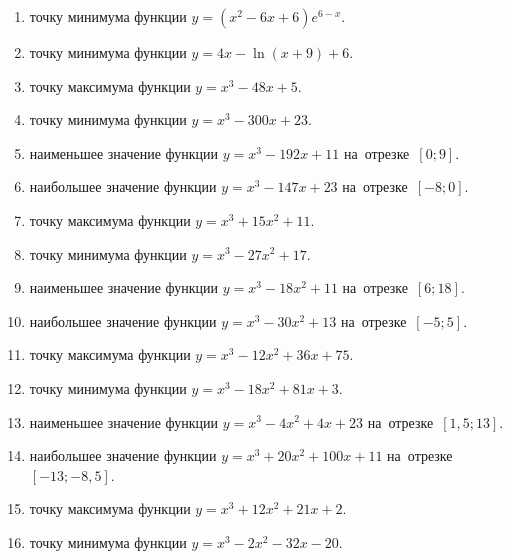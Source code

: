 \documentclass[a4paper,10pt]{article}
\begin{document}
\begin{enumerate}
\item {} точку минимума функции $y=\left(x^2-6x+6\right){{e}^{6-x}}$.

\item {} точку минимума функции $y=4x-\ln \left(x+9\right)+6$.

\item {} точку максимума функции $y=x^3 -48x +5$.

\item {} точку минимума функции $y=x^3 -300x+23$.

\item {} наименьшее значение функции $y=x^3 -192x+11$ на~отрезке~$\left[0;9\right]$.

\item {} наибольшее значение функции $y=x^3 -147x+23$ на~отрезке~$\left[-8;0\right]$.

\item {} точку максимума функции $y=x^3 +15x^2+11$.

\item {} точку минимума функции $y=x^3 -27x^2+17$.

\item {} наименьшее значение функции $y=x^3 -18x^2+11$ на~отрезке~$\left[6;18\right]$.

\item {} наибольшее значение функции $y=x^3 -30x^2+13$ на~отрезке~$\left[-5;5\right]$.

\item {} точку максимума функции $y=x^3 -12x^2+36x+75$.

\item {} точку минимума функции $y=x^3 -18x^2+81x+3$.

\item {} наименьшее значение функции $y=x^3 -4x^2+4x+23$ на~отрезке~$\left[1,5;13\right]$.

\item {} наибольшее значение функции $y=x^3 +20x^2+100x+11$ на~отрезке~$\left[-13;-8,5\right]$.

\item {} точку максимума функции $y=x^3 +12x^2+21x+2$.

\item {} точку минимума функции $y=x^3 -2x^2-32x-20$.


\end{enumerate}
\end{document}
